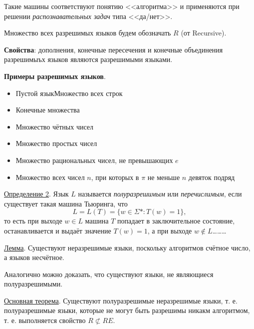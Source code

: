 Такие машины соответствуют понятию <<алгоритма>> и применяются при решении \textit{распознавательных задач} типа <<да/нет>>.

Множество всех разрешимых языков будем обозначать $R$ (от Recursive).

\textbf{Свойства}: дополнения, конечные пересечения и конечные объединения разрешимыъх языков являются разрешимыми языками.

\textbf{Примеры разрешимых языков}.
\begin{itemize}
    \item Пустой языкМножество всех строк
    \item Конечные множества
    \item Множество чётных чисел
    \item Множество простых чисел
    \item Множество рациональных чисел, не превышающих $e$
    \item Множество всех чисел $n$, при которых в $\pi$ не меньше $n$ девяток подряд
\end{itemize}

\underline{Определение 2}. Язык $L$ называется \textit{полуразрешимым} или \textit{перечислимым}, если существует такая машина Тьюринга, что
\begin{equation}
    L = L(T) = \{w \in \Sigma* : T(w) = 1\},
\end{equation}
то есть при выходе $w \in L$ машина $T$ попадает в заключительное состояние, останавливается и выдаёт значение $T(w) = 1$, а при выходе $w \not \in L$\dots\dots\dots

\underline{Лемма}. Существуют неразрешимые языки, поскольку алгоритмов счётное число, а языков несчётное.

Аналогично можно доказать, что существуют языки, не являющиеся полуразрешимыми.

\underline{Основная теорема}. Существуют полуразрешимые неразрешимые языки, т. е. полуразрешимые языки, которые не могут быть разрешимы никакм алгоритмом, т. е. выполняется свойство $R \not \subset RE$.